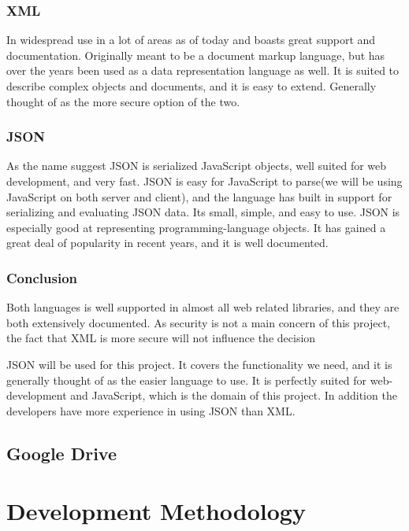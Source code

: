 \subsubsection{XML}
In widespread use in a lot of areas as of today and boasts great support and documentation. Originally meant to be a document markup language, but has over the years been used as a data representation language as well. It is suited to describe complex objects and documents, and it is easy to extend. Generally thought of as the more secure option of the two.

\subsubsection{JSON}
As the name suggest JSON is serialized JavaScript objects, well suited for web development, and very fast. JSON is easy for JavaScript to parse(we will be using JavaScript on both server and client), and the language has built in support for serializing and evaluating JSON data. Its small, simple, and easy to use. JSON is especially good at representing programming-language objects. It has gained a great deal of popularity in recent years, and it is well documented.

\subsubsection{Conclusion}
Both languages is well supported in almost all web related libraries, and they are both extensively documented. As security is not a main concern of this project, the fact that XML is more secure will not influence the decision

JSON will be used for this project. It covers the functionality we need, and it is generally thought of as the easier language to use. It is perfectly suited for web- development and JavaScript, which is the domain of this project. In addition the developers have more experience in using JSON than XML.

\subsection{Google Drive}

\section{Development Methodology}
